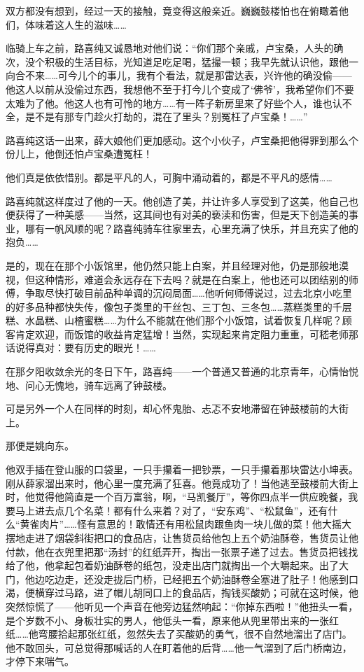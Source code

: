 \par 双方都没有想到，经过一天的接触，竟变得这般亲近。巍巍鼓楼怕也在俯瞰着他们，体味着这人生的滋味……
\par 临骑上车之前，路喜纯又诚恳地对他们说：“你们那个亲戚，卢宝桑，人头的确次，没个积极的生活目标，光知道足吃足喝，猛撮一顿；我早先就认识他，跟他一向合不来……可今儿个的事儿，我有个看法，就是那雷达表，兴许他的确没偷——他这人以前从没偷过东西，我想他不至于打今儿个变成了‘佛爷’，我希望你们不要太难为了他。他这人也有可怜的地方……有一阵子新房里来了好些个人，谁也认不全，是不是有那专门趁火打劫的，混在了里头？别冤枉了卢宝桑！……”
\par 路喜纯这话一出来，薛大娘他们更加感动。这个小伙子，卢宝桑把他得罪到那么个份儿上，他倒还怕卢宝桑遭冤枉！
\par 他们真是依依惜别。都是平凡的人，可胸中涌动着的，都是不平凡的感情……
\par 路喜纯就这样度过了他的一天。他创造了美，并让许多人享受到了这美，他自己也便获得了一种美感——当然，这其间也有对美的亵渎和伤害，但是天下创造美的事业，哪有一帆风顺的呢？路喜纯骑车往家里去，心里充满了快乐，并且充实了他的抱负……
\par 是的，现在在那个小饭馆里，他仍然只能上白案，并且经理对他，仍是那般地漠视，但这种情形，难道会永远存在下去吗？就是在白案上，他也还可以团结别的师傅，争取尽快打破目前品种单调的沉闷局面……他听何师傅说过，过去北京小吃里的好多品种都快失传，像包子类里的干丝包、三丁包、三冬包……蒸糕类里的千层糕、水晶糕、山楂蜜糕……为什么不能就在他们那个小饭馆，试着恢复几样呢？顾客肯定欢迎，而饭馆的收益肯定猛增！当然，实现起来肯定阻力重重，可嵇老师那话说得真对：要有历史的眼光！……
\par 在那夕阳收敛余光的冬日下午，路喜纯——一个普通又普通的北京青年，心情怡悦地、问心无愧地，骑车远离了钟鼓楼。
\par 可是另外一个人在同样的时刻，却心怀鬼胎、忐忑不安地滞留在钟鼓楼前的大街上。
\par 那便是姚向东。
\par 他双手插在登山服的口袋里，一只手攥着一把钞票，一只手攥着那块雷达小坤表。刚从薛家溜出来时，他心里一度充满了狂喜。他竟成功了！当他逃至鼓楼前大街上时，他觉得他简直是一个百万富翁，啊，“马凯餐厅”，等你四点半一供应晚餐，我要马上进去点几个名菜！都有什么来着？对了，“安东鸡”、“松鼠鱼”，还有什么“黄雀肉片”……怪有意思的！敢情还有用松鼠肉跟鱼肉一块儿做的菜！他大摇大摆地走进了烟袋斜街把口的食品店，让售货员给他包上五个奶油酥卷，售货员让他付款，他在衣兜里把那“汤封”的红纸弄开，掏出一张票子递了过去。售货员把钱找给了他，他拿起包着奶油酥卷的纸包，没走出店门就掏出一个大嚼起来。出了大门，他边吃边走，还没走拢后门桥，已经把五个奶油酥卷全塞进了肚子！他感到口渴，便横穿过马路，进了帽儿胡同口上的食品店，掏钱买酸奶；可就在这时候，他突然惊慌了——他听见一个声音在他旁边猛然响起：“你掉东西啦！”他扭头一看，是个岁数不小、身板壮实的男人，他低头一看，原来他从兜里带出来的一张红纸……他弯腰拾起那张红纸，忽然失去了买酸奶的勇气，很不自然地溜出了店门。他不敢回头，可总觉得那喊话的人在盯着他的后背……他一气溜到了后门桥南边，才停下来喘气。
